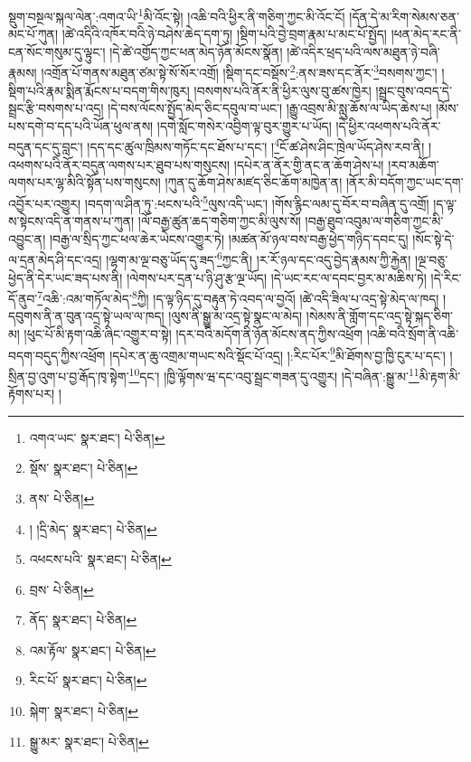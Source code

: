 སྡུག་བསྔལ་སྐལ་ལེན་:འགའ་ཡི་\footnote{འགའ་ཡང་  སྣར་ཐང་།  པེ་ཅིན། }མི་འོང་སྟེ། །འཆི་བའི་ཕྱིར་ནི་གཅིག་ཀྱང་མི་འོང་ངོ། །དོན་དེ་མ་རིག་སེམས་ཅན་མང་པོ་ཀུན། །ཚེ་འདིའི་འཁོར་བའི་ཉེ་བཤེས་ཆེད་དག་ཏུ། །སྡིག་པའི་བྱེ་བྲག་རྣམ་པ་མང་པོ་སྤྱོད། །ཕན་མེད་རང་ནི་ངན་སོང་གསུམ་དུ་ལྟུང་། །དེ་ཚེ་འགྱོད་ཀྱང་ཕན་མེད་ཉོན་མོངས་སྣོན། །ཚེ་འདིར་ཕྲད་པའི་ལས་མཐུན་ཉེ་བཞི་རྣམས། །འགྲོན་པོ་གནས་མཐུན་ཙམ་སྟེ་སོ་སོར་འགྲོ། །སྡིག་དང་བསྡོས་\footnote{སྡོས་  སྣར་ཐང་།  པེ་ཅིན། }:ནས་ཟས་དང་ནོར་\footnote{ནས་  པེ་ཅིན། }བསགས་ཀྱང་། །སྡིག་པའི་རྣམ་སྨིན་རྨོངས་པ་བདག་གིས་ཁུར། །བསགས་པའི་ནོར་ནི་ཕྱིར་ལུས་བུ་ཚས་ཁྱེར། །སྦྲང་བུས་འབད་དེ་སྦྲང་རྩི་བསགས་པ་འདྲ། །དེ་བས་ལོངས་སྤྱོད་མེད་ཅིང་དབུལ་བ་ཡང་། །རྒྱུ་འབྲས་མི་སླུ་ཆོས་ལ་ཡིད་ཆེས་པ། །མོས་པས་དགེ་བ་དད་པའི་ཡོན་ཕུལ་ནས། །དགེ་སློང་གསེར་འབྱིག་ལྟ་བུར་གྱུར་པ་ཡོད། །དེ་ཕྱིར་འཕགས་པའི་ནོར་བདུན་དང་དུ་བླང་། །དད་དང་ཚུལ་ཁྲིམས་གཏོང་དང་ཐོས་པ་དང་། །\footnote{། །དྲི་མེད་  སྣར་ཐང་།  པེ་ཅིན། }ངོ་ཚ་ཤེས་ཤིང་ཁྲེལ་ཡོད་ཤེས་རབ་ནི། །འཕགས་པའི་ནོར་བདུན་ལགས་པར་ཐུབ་པས་གསུངས། །དཔེར་ན་ནོར་གྱི་ནང་ན་ཆོག་ཤེས་པ། །རབ་མཆོག་ལགས་པར་ལྷ་མིའི་སྟོན་པས་གསུངས། །ཀུན་དུ་ཆོག་ཤེས་མཛད་ཅིང་ཆོག་མཁྱེན་ན། །ནོར་མི་བདོག་ཀྱང་ཡང་དག་འབྱོར་པར་འགྱུར། །བདག་ལ་ཤིན་ཏུ་:ཕངས་པའི་\footnote{འཕངས་པའི་  སྣར་ཐང་།  པེ་ཅིན། }ལུས་འདི་ཡང་། །གོས་རྙིང་ལམ་དུ་བོར་བ་བཞིན་དུ་འགྲོ། །ད་ལྟ་ས་སྟེངས་འདི་ན་གནས་པ་ཀུན། །ལོ་བརྒྱ་ཚུན་ཆད་གཅིག་ཀྱང་མི་ལུས་སོ། །བརྒྱ་ཐུབ་འབུམ་ལ་གཅིག་ཀྱང་མི་འབྱུང་ན། །བརྒྱ་ལ་སྲིད་ཀྱང་ཕལ་ཆེར་ཡེངས་འགྱུར་ཏེ། །མཚན་མོ་ཉལ་བས་བརྒྱ་ཕྱེད་གཉིད་དབང་དུ། །སོང་སྟེ་དེ་ལ་དྲན་མེད་ཤི་དང་འདྲ། །ལྷག་མ་ལྔ་བཅུ་ཡོད་དུ་ཟད་\footnote{བྲས་  པེ་ཅིན། }ཀྱང་ནི། །ར་རོ་ཉལ་དང་འདུ་བྱེད་རྣམས་ཀྱི་རྐྱེན། །ལྔ་བཅུ་ཕྱེད་ནི་དེར་ཡང་ཟད་པས་ནི། །ལེགས་པར་དྲན་པ་ཉི་ཤུ་རྩ་ལྔ་ཡོད། །དེ་ཡང་རང་ལ་དབང་བྱར་མ་མཆིས་ཏེ། །དེ་རིང་དོ་ནུབ་\footnote{ནོད་  སྣར་ཐང་།  པེ་ཅིན། }འཆི་:འམ་གཏོལ་མེད་\footnote{འམ་རྟོལ་  སྣར་ཐང་།  པེ་ཅིན། }ཀྱི། །ད་ལྟ་ཉིད་དུ་བརྟུན་ཏེ་འབད་ལ་བྱའོ། །ཚེ་འདི་ཟིལ་པ་འདྲ་སྟེ་མེད་ལ་ཁད། །དབུགས་ནི་ན་བུན་འདྲ་སྟེ་ཡལ་ལ་ཁད། །ལུས་ནི་སྒྱུ་མ་འདྲ་སྟེ་སྣང་ལ་མེད། །སེམས་ནི་གློག་དང་འདྲ་སྟེ་སྐད་ཅིག་མ། །ཕུང་པོ་མི་རྟག་འཆི་ཞིང་འགྱུར་བ་སྟེ། །དར་བའི་མདོག་ནི་ཉོན་མོངས་ནད་ཀྱིས་འཕྲོག །འཆི་བའི་སྲོག་ནི་འཆི་བདག་བདུད་ཀྱིས་འཕྲོག །དཔེར་ན་ཆུ་འགྲམ་གཡང་སའི་སྡོང་པོ་འདྲ། །:རིང་པོར་\footnote{རིང་པོ་  སྣར་ཐང་།  པེ་ཅིན། }མི་ཐོགས་བྱ་ཁྱི་ངུར་པ་དང་། །སྲིན་བྱ་འུག་པ་བྱ་རྒོད་ཁྭ་སྟེག་\footnote{སྐེག་  སྣར་ཐང་།  པེ་ཅིན། }དང་། །ཁྱི་ལྟོགས་ཝ་དང་འབུ་སྦྲང་གཟན་དུ་འགྱུར། །དེ་བཞིན་:སྒྱུ་མ་\footnote{སྒྱུ་མར་  སྣར་ཐང་།  པེ་ཅིན། }མི་རྟག་མི་རྟོགས་པར། །
